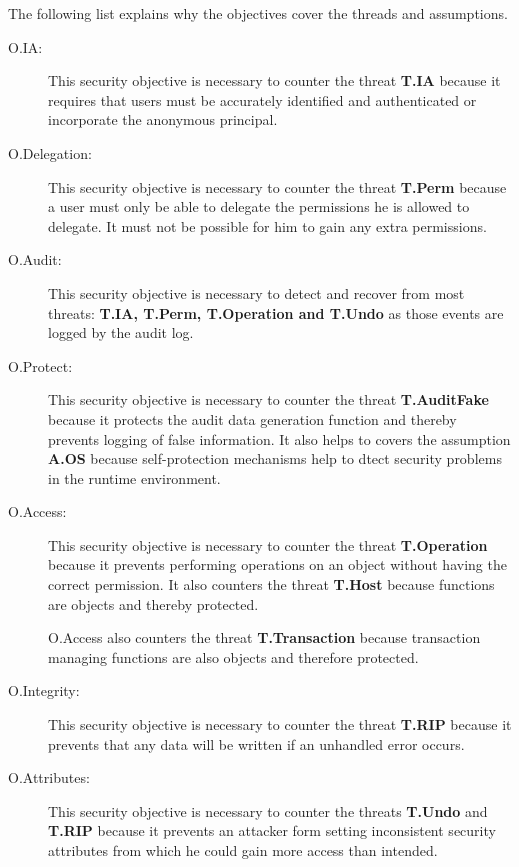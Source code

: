 \documentclass[12pt,english]{scrbook}
\begin{document}
The following list explains why the objectives cover
the threads and assumptions.

\begin{description}
  
  \item[O.IA:] This security objective is necessary to counter the threat
  \textbf{T.IA} because it requires that users must be accurately identified
  and authenticated or incorporate the anonymous principal.

  \item[O.Delegation:] This security objective is necessary to counter the
  threat \textbf{T.Perm} because a user must only be able to delegate the permissions
  he is allowed to delegate. It must not be possible for him to gain any extra
  permissions.
  
  \item[O.Audit:] This security objective is necessary to detect and recover
  from most threats: \textbf{T.IA, T.Perm, T.Operation and T.Undo}
  as those events are logged by the audit log.
  
  \item[O.Protect:] This security objective is necessary to counter the threat
  \textbf{T.AuditFake} because it protects the audit data generation function
  and thereby prevents logging of false information. It also helps to covers
  the assumption \textbf{A.OS} because self-protection mechanisms help to
  dtect security problems in the runtime environment.
  
  \item[O.Access:] This security objective is necessary to counter the threat
  \textbf{T.Operation} because it prevents performing operations on an object
  without having the correct permission. It also counters the threat
  \textbf{T.Host} because functions are objects and thereby protected.

  O.Access also counters the threat \textbf{T.Transaction} because transaction
  managing functions are also objects and therefore protected.

  \item[O.Integrity:] This security objective is necessary to counter the
  threat \textbf{T.RIP} because it prevents that any data will be written if
  an unhandled error occurs.
  
  \item[O.Attributes:] This security objective is necessary to counter the
  threats \textbf{T.Undo} and \textbf{T.RIP} because it
  prevents an attacker form setting inconsistent security attributes from
  which he could gain more access than intended.


\end{description}
\end{document}
